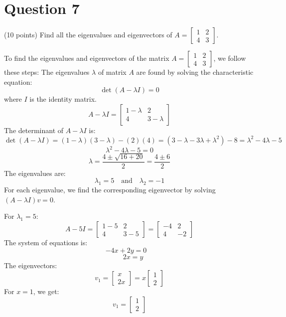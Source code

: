 \documentclass{article}
\begin{document}
\section*{Question 7} (10 points) Find all the eigenvalues and eigenvectors of $A = \begin{bmatrix}1 & 2 \\ 4 & 3\end{bmatrix}$.

To find the eigenvalues and eigenvectors of the matrix \( A = \begin{bmatrix}1 & 2 \\ 4 & 3\end{bmatrix} \), we follow these steps:
The eigenvalues \(\lambda\) of matrix \( A \) are found by solving the characteristic equation:
\[
\det(A - \lambda I) = 0
\]
where \( I \) is the identity matrix.
\[
A - \lambda I = \begin{bmatrix}1 - \lambda & 2 \\ 4 & 3 - \lambda\end{bmatrix}
\]
The determinant of \( A - \lambda I \) is:
\[
\det(A - \lambda I) = (1 - \lambda)(3 - \lambda) - (2)(4) = (3 - \lambda - 3\lambda + \lambda^2) - 8 = \lambda^2 - 4\lambda - 5
\]
\[
\lambda^2 - 4\lambda - 5 = 0
\]
\[
\lambda = \frac{4 \pm \sqrt{16 + 20}}{2} = \frac{4 \pm 6}{2}
\]
The eigenvalues are:
\[
\lambda_1 = 5 \quad \text{and} \quad \lambda_2 = -1
\]
For each eigenvalue, we find the corresponding eigenvector by solving \((A - \lambda I)v = 0\).

For \(\lambda_1 = 5\):
\[
A - 5I = \begin{bmatrix}1 - 5 & 2 \\ 4 & 3 - 5\end{bmatrix} = \begin{bmatrix}-4 & 2 \\ 4 & -2\end{bmatrix}
\]
The system of equations is:
\[ -4x + 2y = 0 \quad \]
\[ \quad 2x = y \]
The eigenvectors:
\[
v_1 = \begin{bmatrix}x \\ 2x\end{bmatrix} = x \begin{bmatrix}1 \\ 2\end{bmatrix}
\]
For \(x = 1\), we get:
\[
v_1 = \begin{bmatrix}1 \\ 2\end{bmatrix}
\]
\end{document}
